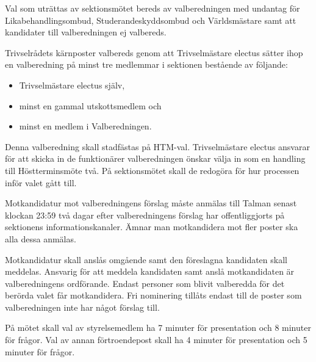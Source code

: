 \documentclass{dsekpolicy}
\begin{document}
  Val som uträttas av sektionsmötet bereds av valberedningen med undantag för
  Likabehandlingsombud, Studerandeskyddsombud och Världsmästare samt att
  kandidater till valberedningen ej valbereds.

  Trivselrådets kärnposter valbereds genom att Trivselmästare electus sätter ihop
  en valberedning på minst tre medlemmar i sektionen bestående av följande:
  \begin{itemize}
    \item Trivselmästare electus själv,
    \item minst en gammal utskottsmedlem och
    \item minst en medlem i Valberedningen.

  \end{itemize}
  Denna valberedning skall stadfästas på HTM-val. Trivselmästare electus
  ansvarar för att skicka in de funktionärer valberedningen önskar välja in som
  en handling till Höstterminsmöte två. På sektionsmötet skall de redogöra för
  hur processen inför valet gått till.

  Motkandidatur mot valberedningens förslag måste anmälas till Talman senast
  klockan 23:59 två dagar efter valberedningens förslag har offentliggjorts på
  sektionens informationskanaler. Ämnar man motkandidera mot fler poster ska alla
  dessa anmälas.

  Motkandidatur skall anslås omgående samt den föreslagna kandidaten skall
  meddelas. Ansvarig för att meddela kandidaten samt anslå motkandidaten är
  valberedningens ordförande. Endast personer som blivit valberedda för det
  berörda valet får motkandidera.  Fri nominering tillåts endast till de poster
  som valberedningen inte har något förslag till.

  På mötet skall val av styrelsemedlem ha 7 minuter för presentation och 8
  minuter för frågor. Val av annan förtroendepost skall ha 4 minuter för
  presentation och 5 minuter för frågor.
\end{document}
